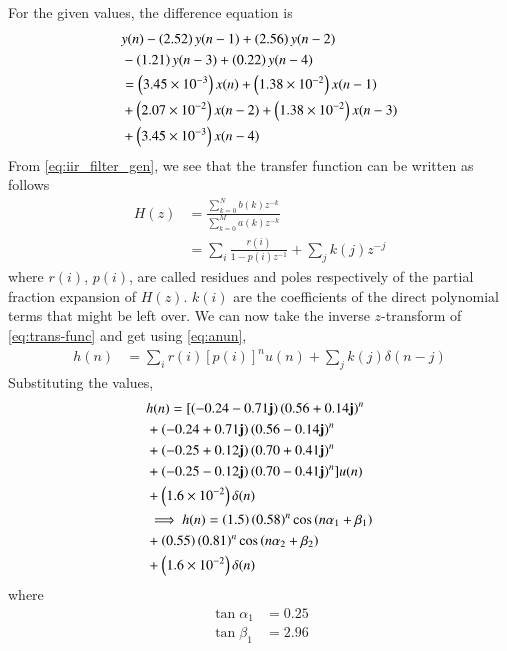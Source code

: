 \documentclass[journal,12pt,twocolumn]{IEEEtran}
\renewcommand\thesection{\arabic{section}}
\begin{document}
\begin{enumerate}[label=\thesection.\arabic*.,ref=\thesection.\theenumi]
\solution
For the given values, the difference equation is
\begin{align}
	&y(n) - \left(2.52\right)y(n - 1) + \left(2.56\right)y(n - 2) \nonumber \\
	&- \left(1.21\right)y(n - 3) + \left(0.22\right)y(n - 4) \nonumber \\
	&= \left(3.45 \times 10^{-3}\right)x(n) + \left(1.38 \times 10^{-2}\right)x(n - 1) \nonumber \\
	&+ \left(2.07 \times 10^{-2}\right)x(n - 2) + \left(1.38 \times 10^{-2}\right)x(n - 3) \nonumber \\
	&+ \left(3.45 \times 10^{-3}\right)x(n - 4)
\end{align}
From \eqref{eq:iir_filter_gen}, we see that the transfer function can be written as follows
\begin{align}
	H(z) &= \frac{\sum_{k = 0}^{N}b(k)z^{-k}}{\sum_{k = 0}^{M}a(k)z^{-k}} \\
		 &= \sum_{i}\frac{r(i)}{1 - p(i)z^{-1}} + \sum_{j}k(j)z^{-j}
	\label{eq:trans-func}
\end{align}
where $r(i)$, $p(i)$, are called residues and poles respectively of the partial 
fraction expansion of $H(z)$. $k(i)$ are the coefficients of the direct polynomial 
terms that might be left over. We can now take the inverse $z$-transform of
\eqref{eq:trans-func} and get using \eqref{eq:anun},
\begin{align}
	h(n) &= \sum_{i}r(i)[p(i)]^nu(n) + \sum_{j}k(j)\delta(n - j)
	\label{eq:h-n-expr}
\end{align}
Substituting the values,
\begin{align}
	&h(n) = [\left(-0.24-0.71\mathbf{j}\right)\left(0.56+0.14\mathbf{j}\right)^n \nonumber \\
	&+ \left(-0.24+0.71\mathbf{j}\right)\left(0.56-0.14\mathbf{j}\right)^n \nonumber \\
	&+ \left(-0.25+0.12\mathbf{j}\right)\left(0.70+0.41\mathbf{j}\right)^n \nonumber \\
	&+ \left(-0.25-0.12\mathbf{j}\right)\left(0.70-0.41\mathbf{j}\right)^n]u(n) \nonumber \\
	&+ \left(1.6 \times 10^{-2}\right)\delta(n) \\
	&\implies h(n) = \left(1.5\right)\left(0.58\right)^n\cos\left(n\alpha_1 + \beta_1\right) \nonumber \\
	&+ \left(0.55\right)\left(0.81\right)^n\cos\left(n\alpha_2 + \beta_2\right) \nonumber \\
	&+ \left(1.6 \times 10^{-2}\right)\delta(n)
	\label{eq:h-n-real}
\end{align}
where
\begin{align}
	\tan{\alpha_1} &= 0.25 \\
	\tan{\beta_1} &= 2.96 \\

\end{align}
\end{enumerate}
\end{document}
